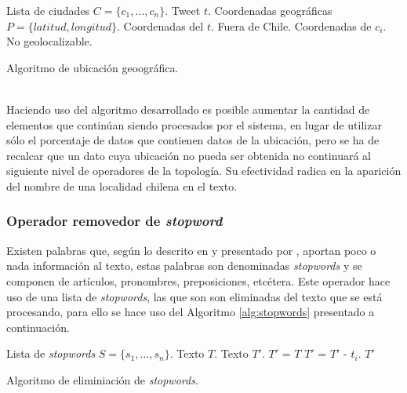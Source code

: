 \begin{algorithm}[H]
	\begin{algorithmic}
		\REQUIRE Lista de ciudades $C=\{c_{1}, \dots, c_{n} \}$.
		\REQUIRE Tweet $t$.
		\ENSURE Coordenadas geográficas $P=\{latitud, longitud\}$.
				\RETURN Coordenadas del $t$.
			\ELSE
				\RETURN Fuera de Chile.
			\ENDIF
		\ELSE
				\RETURN Coordenadas de $c_{i}$.
			\ELSE
				\RETURN No geolocalizable.
			\ENDIF
		\ENDIF
	\end{algorithmic}
	\caption{Algoritmo de ubicación geoográfica.}
	\label{alg:geolocalizacion}
\end{algorithm}\vphantom\\

Haciendo uso del algoritmo desarrollado es posible aumentar la cantidad de elementos que continúan siendo procesados por el sistema, en lugar de utilizar sólo el porcentaje de datos que contienen datos de la ubicación, pero se ha de recalcar que un dato cuya ubicación no pueda ser obtenida no continuará al siguiente nivel de operadores de la topología. Su efectividad radica en la aparición del nombre de una localidad chilena en el texto.

\subsubsection*{Operador removedor de \textit{stopword}}
\label{subsubsec:5op}

Existen palabras que, según lo descrito en \citep{IRQE} y presentado por \citep{JustifStopStemm}, aportan poco o nada información al texto, estas palabras son denominadas \textit{stopwords} y se componen de artículos, pronombres, preposiciones, etcétera. Este operador hace uso de una lista de \textit{stopwords}, las que son son eliminadas del texto que se está procesando, para ello se hace uso del Algoritmo \ref{alg:stopwords} presentado a continuación.\\

\begin{algorithm}[H]
	\begin{algorithmic}
		\REQUIRE Lista de \textit{stopwords} $S=\{s_{1}, \dots, s_{n} \}$.
		\REQUIRE Texto $T$.
		\ENSURE Texto $T'$.
		\STATE $T'$ = $T$
			\STATE $T'$ = $T'$ - $t_{i}$. 
			\ENDIF
		\ENDFOR
		\RETURN $T'$
	\end{algorithmic}
	\caption{Algoritmo de eliminiación de \textit{stopwords}.}
	\label{alg:stopwords}
\end{algorithm}\vphantom\\

